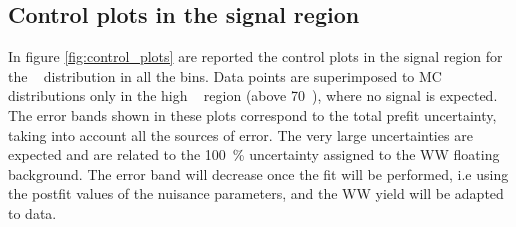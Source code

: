 
\subsection{Control plots in the signal region}
In figure \ref{fig:control_plots} are reported the control plots in the signal region for the \mll~ distribution in all the \pth bins. Data points are superimposed to MC distributions only in the high \mll~ region (above 70~\GeV), where no signal is expected. The error bands shown in these plots correspond to the total prefit uncertainty, taking into account all the sources of error. The very large uncertainties are expected and are related to the 100~\% uncertainty assigned to the WW floating background. The error band will decrease once the fit will be performed, i.e using the postfit values of the nuisance parameters, and the WW yield will be adapted to data.
